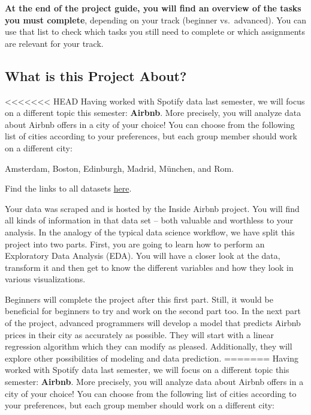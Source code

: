 \documentclass[
  11pt,
]{article}
\begin{document}
\textbf{At the end of the project guide, you will find an overview of the tasks you must complete}, depending on your track (beginner vs.~advanced).
You can use that list to check which tasks you still need to complete or which assignments are relevant for your track.

\hypertarget{what-is-this-project-about}{%
\subsection{What is this Project About?}\label{what-is-this-project-about}}

<<<<<<< HEAD
Having worked with Spotify data last semester, we will focus on a different topic this semester: \textbf{Airbnb}.
More precisely, you will analyze data about Airbnb offers in a city of your choice!
You can choose from the following list of cities according to your preferences, but each group member should work on a different city:

Amsterdam, Boston, Edinburgh, Madrid, München, and Rom.

Find the links to all datasets \href{https://docs.google.com/document/d/1nBkeJmpnoiATVw4B3DwrB45uo0TpQFE_iTisyh4p9Ro/edit?usp=sharing}{here}.

Your data was scraped and is hosted by the Inside Airbnb project.
You will find all kinds of information in that data set -- both valuable and worthless to your analysis.
In the analogy of the typical data science workflow, we have split this project into two parts.
First, you are going to learn how to perform an Exploratory Data Analysis (EDA).
You will have a closer look at the data, transform it and then get to know the different variables and how they look in various visualizations.

Beginners will complete the project after this first part.
Still, it would be beneficial for beginners to try and work on the second part too.
In the next part of the project, advanced programmers will develop a model that predicts Airbnb prices in their city as accurately as possible.
They will start with a linear regression algorithm which they can modify as pleased.
Additionally, they will explore other possibilities of modeling and data prediction.
=======
Having worked with Spotify data last semester, we will focus on a different topic this semester: \textbf{Airbnb}. More precisely, you will analyze data about Airbnb offers in a city of your choice!
You can choose from the following list of cities according to your preferences, but each group member should work on a different city:
\end{document}
